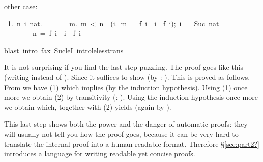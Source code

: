 \begin{isabelle}
\begin{isamarkuptxt}
other case:
\begin{isabellepar}%
\ 1.\ {\isasymAnd}\mbox{n}\ \mbox{i}\ \mbox{nat}.\isanewline
\ \ \ \ \ \ \ {\isasymlbrakk}{\isasymforall}\mbox{m}.\ \mbox{m}\ <\ \mbox{n}\ {\isasymlongrightarrow}\ ({\isasymforall}\mbox{i}.\ \mbox{m}\ =\ f\ \mbox{i}\ {\isasymlongrightarrow}\ \mbox{i}\ {\isasymle}\ f\ \mbox{i});\ \mbox{i}\ =\ Suc\ \mbox{nat}{\isasymrbrakk}\isanewline
\ \ \ \ \ \ \ {\isasymLongrightarrow}\ \mbox{n}\ =\ f\ \mbox{i}\ {\isasymlongrightarrow}\ \mbox{i}\ {\isasymle}\ f\ \mbox{i}
\end{isabellepar}%
\end{isamarkuptxt}%
blast\ intro{\isacharbang}{\isacharcolon}\ f{\isacharunderscore}ax\ Suc{\isacharunderscore}leI\ intro{\isacharcolon}le{\isacharunderscore}less{\isacharunderscore}trans{\isacharparenright}%
\begin{isamarkuptext}%
\noindent
It is not surprising if you find the last step puzzling.
The proof goes like this (writing  instead of ).
Since  it suffices to show
 (by : ). This is
proved as follows. From  we have 
(1) which implies  (by the induction hypothesis).
Using (1) once more we obtain  (2) by transitivity
(: ).
Using the induction hypothesis once more we obtain 
which, together with (2) yields  (again by
).

This last step shows both the power and the danger of automatic proofs: they
will usually not tell you how the proof goes, because it can be very hard to
translate the internal proof into a human-readable format. Therefore
\S\ref{sec:part2?} introduces a language for writing readable yet concise
proofs.


\end{isamarkuptext}
\end{isabelle}
